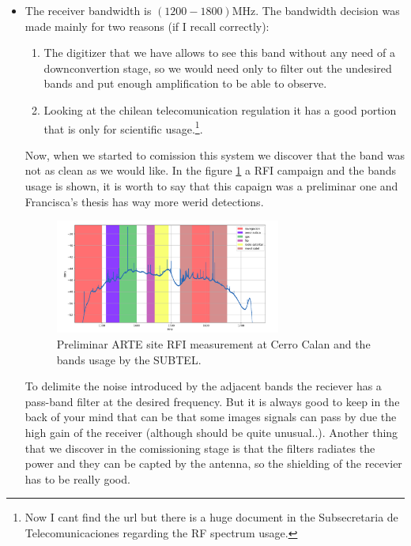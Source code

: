 \begin{itemize}
    \item The receiver bandwidth is $(1200-1800)$MHz. The bandwidth decision was made mainly for two reasons (if I recall correctly):
    \begin{enumerate}
        \item The digitizer that we have allows to see this band without any need of a downconvertion stage, so we would need only to filter out the undesired bands and put enough amplification to be able to observe.
        \item Looking at the chilean telecomunication regulation it has a good portion that is only for scientific usage.\footnote{Now I cant find the url but there is a huge document in the Subsecretaria de Telecomunicaciones regarding the RF spectrum usage.}.
    \end{enumerate}
        Now, when we started to comission this system we discover that the band was not as clean as we would like. In the figure \ref{fig:arte_rfi_meas} a RFI campaign and the bands usage is shown, it is worth to say that this capaign was a preliminar one and Francisca's thesis has way more werid detections.
    \begin{figure}
        \centering
        \includegraphics[width=0.7\textwidth]{images/arte_rfi_meas.png}
        \caption{Preliminar ARTE site RFI measurement at Cerro Calan and the bands usage by the SUBTEL.}
        \label{fig:arte_rfi_meas}
    \end{figure}

        To delimite the noise introduced by the adjacent bands the reciever has a pass-band filter at the desired frequency. But it is always good to keep in the back of your mind that can be that some images signals can pass by due the high gain of the receiver (although should be quite unusual..). Another thing that we discover in the comissioning stage is that the filters radiates the power and they can be capted by the antenna, so the shielding of the recevier has to be really good.
    

\end{itemize}

